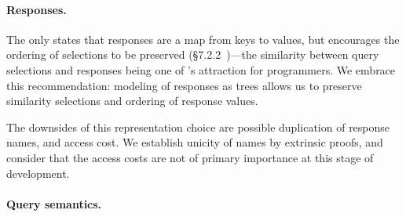 

\paragraph{Responses.}
The \spec only states that responses are a map from keys to values, 
but encourages the ordering of selections to be preserved (\cf\S7.2.2~\cite{gqlspec})---the similarity between query selections and responses being one of \gql's attraction for programmers.  We embrace this recommendation: modeling of responses as trees allows us to preserve similarity \wrt selections and ordering of response values. %

The downsides of this representation choice are possible duplication of response names, and access cost. 
We establish unicity of names by extrinsic proofs, and consider that the access costs are not of primary importance at this stage of development. %


\paragraph{Query semantics.}

